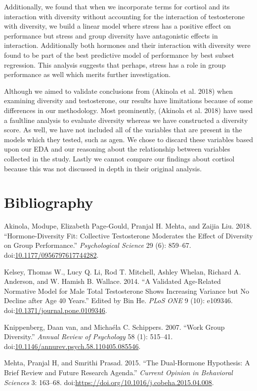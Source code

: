 \documentclass[]{article}
\begin{document}
Additionally, we found that when we incorporate terms for cortisol and
its interaction with diversity without accounting for the interaction of
testosterone with diversity, we build a linear model where stress has a
positive effect on performance but stress and group diversity have
antagonistic effects in interaction. Additionally both hormones and
their interaction with diversity were found to be part of the best
predictive model of performance by best subset regression. This analysis
suggests that perhaps, stress has a role in group performance as well
which merits further investigation.

Although we aimed to validate conclusions from (Akinola et al. 2018)
when examining diversity and testosterone, our results have limitations
because of some differences in our methodology. Most prominently,
(Akinola et al. 2018) have used a faultline analysis to evaluate
diversity whereas we have constructed a diversity score. As well, we
have not included all of the variables that are present in the models
which they tested, such as agen. We chose to discard these variables
based upon our EDA and our reasoning about the relationship between
variables collected in the study. Lastly we cannot compare our findings
about cortisol because this was not discussed in depth in their original
analysis.

\section*{Bibliography}\label{bibliography}

\hypertarget{refs}{}
\hypertarget{ref-Akinola2018}{}
Akinola, Modupe, Elizabeth Page-Gould, Pranjal H. Mehta, and Zaijia Liu.
2018. ``Hormone-Diversity Fit: Collective Testosterone Moderates the
Effect of Diversity on Group Performance.'' \emph{Psychological Science}
29 (6): 859--67.
doi:\href{https://doi.org/10.1177/0956797617744282}{10.1177/0956797617744282}.

\hypertarget{ref-Kelsey2014}{}
Kelsey, Thomas W., Lucy Q. Li, Rod T. Mitchell, Ashley Whelan, Richard
A. Anderson, and W. Hamish B. Wallace. 2014. ``A Validated Age-Related
Normative Model for Male Total Testosterone Shows Increasing Variance
but No Decline after Age 40 Years.'' Edited by Bin He. \emph{PLoS ONE} 9
(10): e109346.
doi:\href{https://doi.org/10.1371/journal.pone.0109346}{10.1371/journal.pone.0109346}.

\hypertarget{ref-vanK}{}
Knippenberg, Daan van, and Michaéla C. Schippers. 2007. ``Work Group
Diversity.'' \emph{Annual Review of Psychology} 58 (1): 515--41.
doi:\href{https://doi.org/10.1146/annurev.psych.58.110405.085546}{10.1146/annurev.psych.58.110405.085546}.

\hypertarget{ref-MEHTA2015163}{}
Mehta, Pranjal H, and Smrithi Prasad. 2015. ``The Dual-Hormone
Hypothesis: A Brief Review and Future Research Agenda.'' \emph{Current
Opinion in Behavioral Sciences} 3: 163--68.
doi:\href{https://doi.org/https://doi.org/10.1016/j.cobeha.2015.04.008}{https://doi.org/10.1016/j.cobeha.2015.04.008}.
\end{document}

